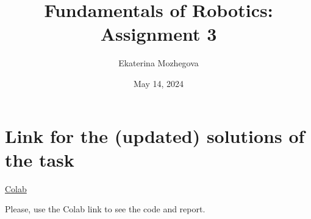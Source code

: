 \documentclass{article}
\title{Fundamentals of Robotics: Assignment 3}
\author{Ekaterina Mozhegova}
\date{May 14, 2024}
\begin{document}
\maketitle

\section{Link for the (updated) solutions of the task}


\href{https://colab.research.google.com/drive/1Ja4AgicXrXQCgEBnWQVlY5cgWEgvaRgQ?usp=sharing}{Colab}

Please, use the Colab link to see the code and report. 
\end{document}
